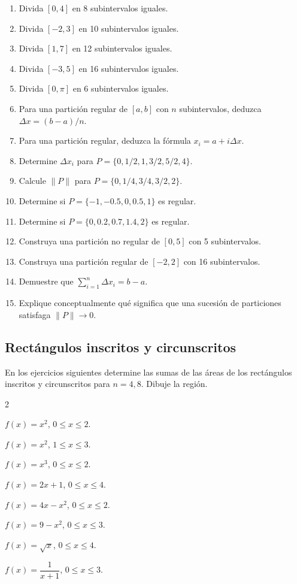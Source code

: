 \documentclass[12pt]{article}
\begin{document}
\begin{enumerate}[resume]
\item Divida $[0,4]$ en 8 subintervalos iguales.
\item Divida $[-2,3]$ en 10 subintervalos iguales.
\item Divida $[1,7]$ en 12 subintervalos iguales.
\item Divida $[-3,5]$ en 16 subintervalos iguales.
\item Divida $[0,\pi]$ en 6 subintervalos iguales.
\item Para una partición regular de $[a,b]$ con $n$ subintervalos, deduzca $\Delta x=(b-a)/n$.
\item Para una partición regular, deduzca la fórmula $x_i=a+i\Delta x$.
\item Determine $\Delta x_i$ para $P=\{0,1/2,1,3/2,5/2,4\}$.
\item Calcule $\|P\|$ para $P=\{0,1/4,3/4,3/2,2\}$.
\item Determine si $P=\{-1,-0.5,0,0.5,1\}$ es regular.
\item Determine si $P=\{0,0.2,0.7,1.4,2\}$ es regular.
\item Construya una partición no regular de $[0,5]$ con 5 subintervalos.
\item Construya una partición regular de $[-2,2]$ con 16 subintervalos.
\item Demuestre que $\sum_{i=1}^{n}\Delta x_i=b-a$.
\item Explique conceptualmente qué significa que una sucesión de particiones satisfaga $\|P\|\to0$.
\end{enumerate}

\subsection*{Rectángulos inscritos y circunscritos}
En los ejercicios siguientes determine las sumas de las áreas de los
rectángulos inscritos y circunscritos para $n=4,8$. Dibuje la región.

\begin{enumerate}[resume]
\begin{multicols}{2}
\item $f(x)=x^2$, $0\le x\le2$.
\item $f(x)=x^2$, $1\le x\le3$.
\item $f(x)=x^3$, $0\le x\le2$.
\item $f(x)=2x+1$, $0\le x\le4$.
\item $f(x)=4x-x^2$, $0\le x\le2$.
\item $f(x)=9-x^2$, $0\le x\le3$.
\item $f(x)=\sqrt{x}$, $0\le x\le4$.
\item $f(x)=\dfrac1{x+1}$, $0\le x\le3$.
\end{multicols}
\end{enumerate}
\end{document}
